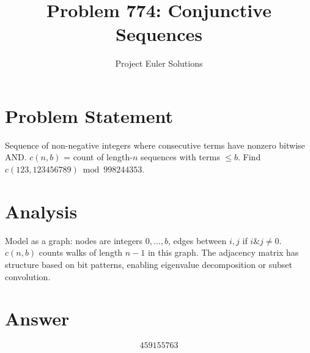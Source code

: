 \documentclass[11pt]{article}
\title{Problem 774: Conjunctive Sequences}
\author{Project Euler Solutions}
\date{}
\begin{document}
\maketitle


\section{Problem Statement}
Sequence of non-negative integers where consecutive terms have nonzero bitwise AND. $c(n,b)$ = count of length-$n$ sequences with terms $\le b$. Find $c(123, 123456789) \bmod 998244353$.

\section{Analysis}
Model as a graph: nodes are integers $0,\ldots,b$, edges between $i,j$ if $i \& j \ne 0$. $c(n,b)$ counts walks of length $n-1$ in this graph. The adjacency matrix has structure based on bit patterns, enabling eigenvalue decomposition or subset convolution.

\section{Answer}

\[
\boxed{459155763}
\]
\end{document}
